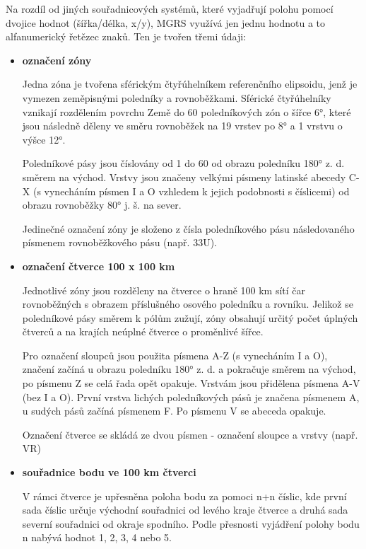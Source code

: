 Na rozdíl od jiných souřadnicových systémů, které vyjadřují polohu pomocí dvojice hodnot (šířka/délka, x/y), MGRS využívá jen jednu hodnotu a to alfanumerický řetězec znaků. Ten je tvořen třemi údaji:

\begin{itemize}
	\item \textbf{označení zóny}
	
	Jedna zóna je tvořena sférickým čtyřúhelníkem referenčního elipsoidu, jenž je vymezen zeměpisnými poledníky a rovnoběžkami. Sférické čtyřúhelníky vznikají rozdělením povrchu Země do 60 poledníkových zón o šířce 6°, které jsou následně děleny ve směru rovnoběžek na 19 vrstev po 8° a 1 vrstvu o výšce 12°.
	
	Poledníkové pásy jsou číslovány od 1 do 60 od obrazu poledníku 180° z. d. směrem na východ. Vrstvy jsou značeny velkými písmeny latinské abecedy C-X (s vynecháním písmen I a O vzhledem k jejich podobnosti s číslicemi) od obrazu rovnoběžky 80° j. š. na sever.
	
	Jedinečné označení zóny je složeno z čísla poledníkového pásu následovaného písmenem rovnoběžkového pásu (např. 33U).
	
	\item \textbf{označení čtverce 100 x 100 km}
	
	Jednotlivé zóny jsou rozděleny na čtverce o hraně 100 km sítí čar rovnoběžných s obrazem příslušného osového poledníku a rovníku. Jelikož se poledníkové pásy směrem k pólům zužují, zóny obsahují určitý počet úplných čtverců a na krajích neúplné čtverce o proměnlivé šířce. 
	
	Pro označení sloupců jsou použita písmena A-Z (s vynecháním I a O), značení začíná u obrazu poledníku 180° z. d. a pokračuje směrem na východ, po písmenu Z se celá řada opět opakuje. Vrstvám jsou přidělena písmena A-V (bez I a O). První vrstva lichých poledníkových pásů je značena písmenem A, u sudých pásů začíná písmenem F. Po písmenu V se abeceda opakuje. 
	
	Označení čtverce se skládá ze dvou písmen - označení sloupce a vrstvy (např. VR)
		
	\item \textbf{souřadnice bodu ve 100 km čtverci}
	
	V rámci čtverce je upřesněna poloha bodu za pomoci n+n číslic, kde první sada číslic určuje východní souřadnici od levého kraje čtverce a druhá sada severní souřadnici od okraje spodního. Podle přesnosti vyjádření polohy bodu n nabývá hodnot 1, 2, 3, 4 nebo 5. 
	

\end{itemize}
